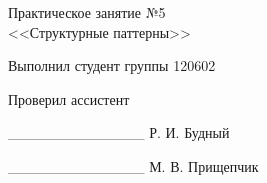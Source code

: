 \thispagestyle{empty}
\setlength{\parindent}{0ex} %

\begin{center}
  Практическое занятие №5 \\
  <<Структурные паттерны>>
\end{center}

\vspace{1\baselineskip}

\begin{minipage}{.5\linewidth}
    Выполнил студент группы 120602 

    \smallskip

    Проверил ассистент
\end{minipage}
\hfill
\begin{minipage}{.45\linewidth}
  \begin{flushright}
    \_\_\_\_\_\_\_\_\_\_\_\_\_ Р. И. Будный 

    \smallskip

    \_\_\_\_\_\_\_\_\_\_\_\_\_ М. В. Прищепчик 
  \end{flushright}
\end{minipage}

\setlength{\parindent}{1.25cm} %
